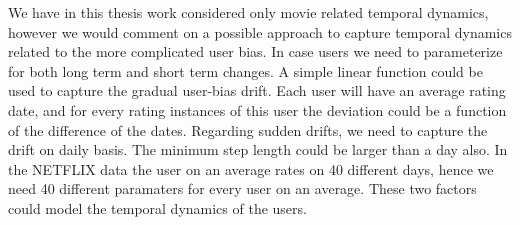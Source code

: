 We have in this thesis work considered only movie related temporal dynamics,
however we would comment on a possible approach to capture temporal dynamics
related to the more complicated user bias. In case users we need to parameterize
for both long term and short term changes. A simple linear function could be
used to capture the gradual user-bias drift. Each user will have an average
rating date, and for every rating instances of this user the deviation could be
a function of the difference of the dates. Regarding sudden drifts, we need to
capture the drift on daily basis. The minimum step length could be larger than a
day also. In the NETFLIX data the user on an average rates on 40 different days,
hence we need 40 different paramaters for every user on an average. These two
factors could model the temporal dynamics of the users.  



